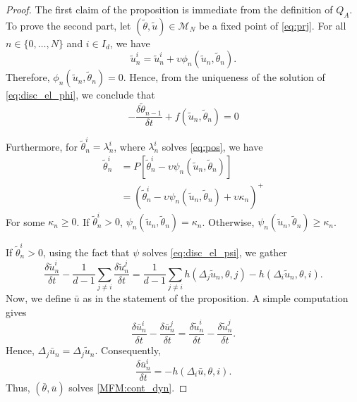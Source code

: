 \documentclass[12pt]{amsart}
\newcommand{\1}{{\chi}}
\newcommand{\Mm}{{\mathcal{M}}}
\newcommand{\lb}{\left(}
\newcommand{\rb}{\right)}
\theoremstyle{definition}
\begin{document}
        \begin{proof}
                        The first claim of the proposition is immediate from the definition of $Q_A$. 
            To prove the second part, let $(\tilde \theta,\tilde u)\in \Mm_N$ be a fixed point of \eqref{eq:prj}. 
            For all $n\in \{0,\ldots,N\}$ and $i \in I_d$, we have
            \begin{equation*}
                \tilde u^i_n = \tilde u^i_n + \upsilon \phi_n(\tilde u_n, \tilde \theta_n).
            \end{equation*}
            Therefore, $\phi_n(\tilde u_n, \tilde \theta_n)=0$. Hence, from the uniqueness
            of the solution of \eqref{eq:disc_el_phi}, we conclude that 
            \[
 -\frac{\delta\tilde \theta_{n-1}}{\delta t} + f(\tilde u_{n},\tilde \theta_{n})=0           
            \]
                
                
            Furthermore, for $\tilde \theta_n^i = \lambda_n^i$, where $\lambda_n^i$ solves \eqref{eq:pos}, we have
                \begin{equation*}
                        \begin{split}
                        \tilde \theta_n^i &= P \left[ \tilde \theta_n^i - \upsilon \psi_n(\tilde u_n, \tilde \theta_n) \right] \\
                                        &= \lb \tilde \theta_n^i - \upsilon \psi_n(\tilde u_n, \tilde \theta_n) + \upsilon \kappa_n \rb^+
                    \end{split}
                \end{equation*}
            For some $\kappa_n\geq 0$. If $\tilde \theta^i_n > 0$, $\psi_n(\tilde u_n, \tilde \theta_n)=\kappa_n$. 
        Otherwise,
        $\psi_n(\tilde u_n, \tilde \theta_n) \geq \kappa_n$.
        
        If $\tilde \theta^i_n > 0$, using the fact that $\psi$ solves \eqref{eq:disc_el_psi}, we gather
          \begin{equation*}
          \frac{\delta \tilde u^i_n}{\delta t} - \frac{1}{d-1}\sum_{j \neq i} \frac{\delta \tilde u^j_n}{\delta t} = \frac{1}{d-1}\sum_{j \neq i} h(\Delta_j \tilde u_n,\theta,j) - h(\Delta_i \tilde u_n,\theta,i).
          \end{equation*}
          Now, we define $\bar u$ as in the statement of the proposition.  
          A simple computation gives 
          \[
           \frac{\delta \bar u^i_n}{\delta t}- \frac{\delta \bar u^j_n}{\delta t}=
           \frac{\delta \tilde u^i_n}{\delta t}- \frac{\delta \tilde u^j_n}{\delta t}.
          \]
          Hence, $\Delta_j \bar u_n=\Delta_j \tilde u_n$. Consequently, 
            \begin{equation*}
            \frac{\delta \bar u^i_n}{\delta t}= - h(\Delta_i \bar u,\theta,i).
            \end{equation*}
Thus, $(\bar \theta, \bar u)$ solves \eqref{MFM:cont_dyn}.            
        \end{proof}
  
\end{document}
